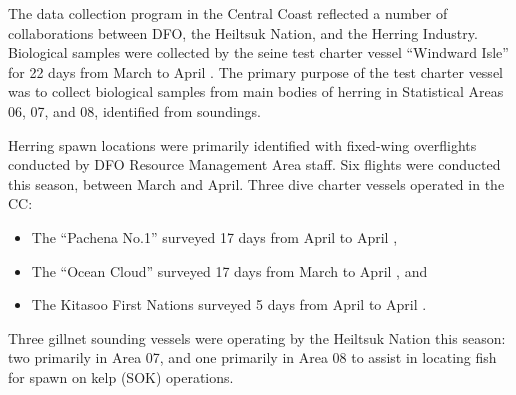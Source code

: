 The data collection program in the Central Coast reﬂected a number of collaborations
between DFO, the Heiltsuk Nation, and the Herring Industry.
Biological samples were collected by the seine test charter vessel ``Windward Isle'' for 22 days from March 
to April .
The primary purpose of the test charter vessel was to collect biological samples from main bodies of herring in Statistical Areas 06, 07, and 08, identiﬁed from soundings.

Herring spawn locations were primarily identiﬁed with ﬁxed-wing overflights conducted by DFO Resource Management Area staff.
Six ﬂights were conducted this season, between March and April.
Three dive charter vessels operated in the CC:
\begin{itemize}
\item The ``Pachena No.1'' surveyed 17 days from April  to April ,
\item The ``Ocean Cloud'' surveyed 17 days from March  to April , and
\item The Kitasoo First Nations surveyed 5 days from April  to April .
\end{itemize}
Three gillnet sounding vessels were operating by the Heiltsuk Nation this season:
two primarily in Area 07, and one primarily in Area 08 to assist in locating fish for spawn on kelp (SOK) operations.